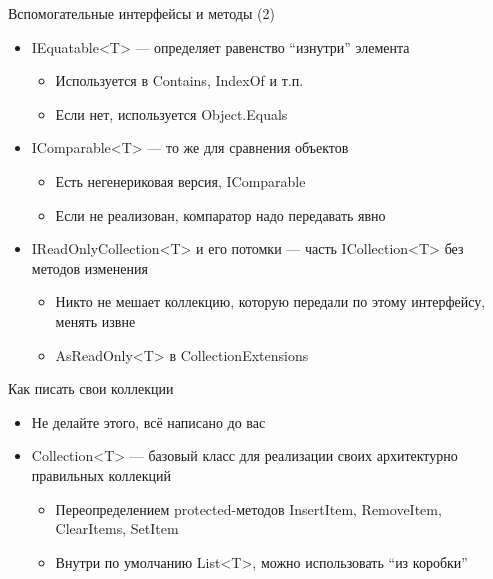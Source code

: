 \documentclass{../../slides-style}
\begin{document}
    \begin{frame}{Вспомогательные интерфейсы и методы (2)}
        \begin{itemize}
            \item IEquatable<T> --- определяет равенство \enquote{изнутри} элемента
            \begin{itemize}
                \item Используется в Contains, IndexOf и т.п.
                \item Если нет, используется Object.Equals
            \end{itemize}
            \item IComparable<T> --- то же для сравнения объектов
            \begin{itemize}
                \item Есть негенериковая версия, IComparable
                \item Если не реализован, компаратор надо передавать явно
            \end{itemize}
            \item IReadOnlyCollection<T> и его потомки --- часть ICollection<T> без методов изменения
            \begin{itemize}
                \item Никто не мешает коллекцию, которую передали по этому интерфейсу, менять извне
                \item AsReadOnly<T> в CollectionExtensions
            \end{itemize}
        \end{itemize}
    \end{frame}

    \begin{frame}{Как писать свои коллекции}
        \begin{itemize}
            \item Не делайте этого, всё написано до вас
            \item Collection<T> --- базовый класс для реализации своих архитектурно правильных коллекций
            \begin{itemize}
                \item Переопределением protected-методов InsertItem, RemoveItem, ClearItems, SetItem
                \item Внутри по умолчанию List<T>, можно использовать \enquote{из коробки}
            \end{itemize}
        \end{itemize}
    \end{frame}
\end{document}
